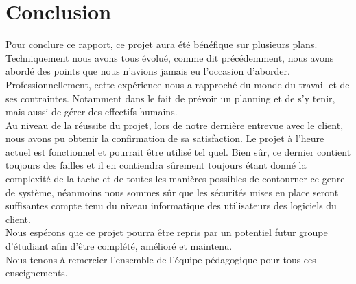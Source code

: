 \chapter{Conclusion}

    Pour conclure ce rapport, ce projet aura été bénéfique sur plusieurs plans.
    Techniquement nous avons tous évolué, comme dit précédemment, nous avons 
    abordé des points que nous n'avions jamais eu l'occasion d'aborder.\\

    Professionnellement, cette expérience nous a rapproché du monde du travail 
    et de ses contraintes. Notamment dans le fait de prévoir un planning et de 
    s'y tenir, mais aussi de gérer des effectifs humains.\\
    
    Au niveau de la réussite du projet, lors de notre dernière entrevue avec le 
    client, nous avons pu obtenir la confirmation de sa satisfaction. Le projet
    à l'heure actuel est fonctionnel et pourrait être utilisé tel quel. Bien sûr,
    ce dernier contient toujours des failles et il en contiendra sûrement 
    toujours étant donné la complexité de la tache et de toutes les manières 
    possibles de contourner ce genre de système, néanmoins nous sommes sûr que 
    les sécurités mises en place seront suffisantes compte tenu du niveau 
    informatique des utilisateurs des logiciels du client.\\

    Nous espérons que ce projet pourra être repris par un potentiel futur groupe 
    d'étudiant afin d'être complété, amélioré et maintenu.\\

    Nous tenons à remercier l'ensemble de l'équipe pédagogique pour tous ces 
    enseignements.

    \label{chapter:bilan}

